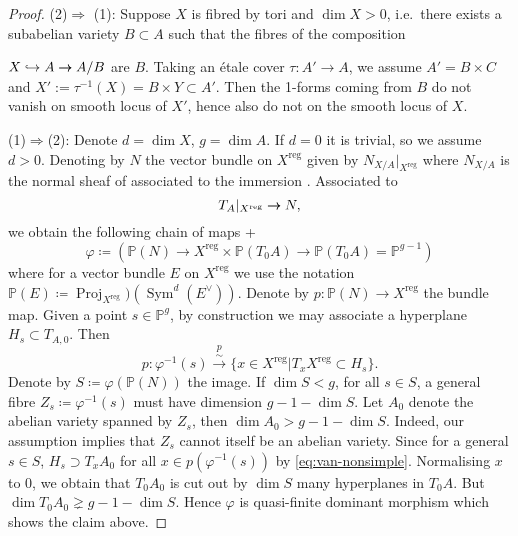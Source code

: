 \documentclass[a4paper,12pt,reqno]{amsart}
\theoremstyle{plain}
\theoremstyle{definition}
\theoremstyle{remark}
\newcommand{\C}{\mathbb C}
\newcommand{\Sym}{\operatorname{Sym}}
\newcommand{\Proj}{\operatorname{Proj}}
\renewcommand{\cong}{\simeq}
\newcommand{\bbP}{\mathbb{P}}
\newcommand{\into}{\hookrightarrow}
\newcommand{\onto}{\rightarrow\hspace*{-.14in}\rightarrow}
\DeclareMathOperator{\reg}{reg}
\begin{document}
\begin{proof}\label{proof:van-nonsimple} (2)$\Rightarrow$ (1): Suppose $X$ is fibred by tori and $\dim X>0$, i.e.\ there exists a subabelian variety $B\subset A$ such that the fibres of the composition 

$X\into A \onto A/B$ are $B$. Taking an \'etale cover $\tau: A'\to A$, we assume $A'=B\times C$ and $X':=\tau^{-1}(X)=B\times Y\subset A'$. Then the 1-forms coming from $B$ do not vanish on smooth locus of $X'$, hence also do not on the smooth locus of $X$. 

(1)$\Rightarrow$(2): Denote $d=\dim X$, $g=\dim A$. If $d=0$ it is trivial, so we assume $d>0$. Denoting by $N$ the
vector bundle on $X^{\reg}$ given by $N_{X/A}|_{X^{\reg}}$ where $N_{X/A}$ is the normal sheaf of associated to the immersion
 \cite[\href{https://stacks.math.columbia.edu/tag/01R1}{Tag 01R1}]{stacks-project}. Associated to \[T_A|_{X^{\reg}}\onto N,\]
we obtain the following chain of maps
+\[\varphi\coloneqq (\bbP(N) \to 	X^{\reg}\times \bbP(T_0{A}) \to \bbP(T_0A)=\bbP^{g-1})\]
where for a vector bundle $E$ on $X^{\reg}$ we use the notation $\bbP(E) \coloneqq \Proj_{X^{\reg}})(\Sym^d(E^{\vee}))$.
Denote by $p\colon \bbP(N)\to X^{\reg}$ the bundle map. Given
a point $s\in \bbP^g$, by construction we may associate a hyperplane $H_s\subset T_{A,0}$. Then
\begin{equation}
p\colon \varphi^{-1}(s) \overset{p}{\xrightarrow{\sim}}  \{x\in X^{\reg}| T_xX^{\reg} \subset H_s\}.
\label{eq:van-nonsimple}
\end{equation}
Denote by $S\coloneqq \varphi(\bbP(N))$ the image. If $\dim S<g$, for all $s\in S$, a general
 fibre $Z_s \coloneqq \varphi^{-1}(s)$
must have dimension $g - 1 - \dim S$. Let $A_0$ denote the abelian variety spanned by $Z_s$, then $\dim A_0 > g- 1 - \dim S$. Indeed,
our assumption implies that $Z_s$ cannot itself be an abelian variety. Since for a general $s\in S$, $H_s \supset T_xA_0$
for all $x\in p(\varphi^{-1}(s))$ by \eqref{eq:van-nonsimple}. Normalising $x$ to $0$, we obtain that $T_0A_0$
is cut out by $\dim S$ many hyperplanes in $T_0A$. But $\dim T_0A_0 \gneq g -1 - \dim S$. Hence $\varphi$ is quasi-finite
dominant morphism which shows the claim above.

\end{proof}
\end{document}
